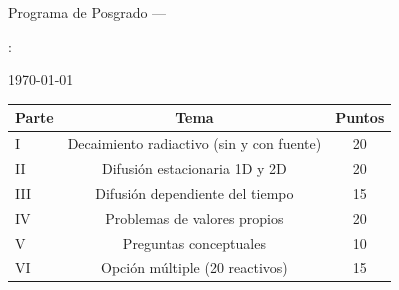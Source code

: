 \begin{center}
  {\large\bfseries \institucion\par}
  \medskip
  Programa de Posgrado --- \programa\par
  \smallskip
  \titulodoc: \subtitulodoc\par
  \smallskip
  \autordoc\par
  \smallskip
  \today
\end{center}

\bigskip

\begin{center}
\begin{tabular}{lcc}\toprule
Parte & Tema & Puntos\\\midrule
I   & Decaimiento radiactivo (sin y con fuente) & 20\\
II  & Difusión estacionaria 1D y 2D             & 20\\
III & Difusión dependiente del tiempo           & 15\\
IV  & Problemas de valores propios              & 20\\
V   & Preguntas conceptuales                    & 10\\
VI  & Opción múltiple (20 reactivos)            & 15\\\bottomrule
\end{tabular}
\end{center}
